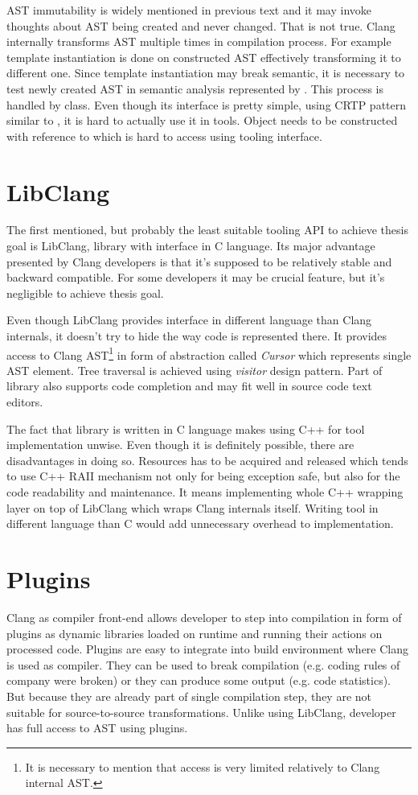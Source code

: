 AST immutability is widely mentioned in previous text and it may invoke thoughts about AST being created and never changed. That is not true. Clang internally transforms AST multiple times in compilation process. For example template instantiation is done on constructed AST effectively transforming it to different one. Since template instantiation may break semantic, it is necessary to test newly created AST in semantic analysis represented by . This process is handled by  class. Even though its interface is pretty simple, using CRTP pattern similar to , it is hard to actually use it in tools. Object needs to be constructed with reference to  which is hard to access using tooling interface. 

\section{LibClang}
The first mentioned, but probably the least suitable tooling API to achieve thesis goal is LibClang, library with interface in C language. Its major advantage presented by Clang developers is that it's supposed to be relatively stable and backward compatible. For some developers it may be crucial feature, but it's negligible to achieve thesis goal.

Even though LibClang provides interface in different language than Clang internals, it doesn't try to hide the way code is represented there. It provides access to Clang AST\footnote{It is necessary to mention that access is very limited relatively to Clang internal AST.} in form of abstraction called \emph{Cursor} which represents single AST element. Tree traversal is achieved using \emph{visitor} design pattern. Part of library also supports code completion and may fit well in source code text editors.

The fact that library is written in C language makes using C++ for tool implementation unwise. Even though it is definitely possible, there are disadvantages in doing so. Resources has to be acquired and released which tends to use C++ RAII mechanism not only for being exception safe, but also for the code readability and maintenance. It means implementing whole C++ wrapping layer on top of LibClang which wraps Clang internals itself. Writing tool in different language than C would add unnecessary overhead to implementation. 

\section{Plugins}
Clang as compiler front-end allows developer to step into compilation in form of plugins as dynamic libraries loaded on runtime and running their actions on processed code. Plugins are easy to integrate into build environment where Clang is used as compiler. They can be used to break compilation (e.g.  coding rules of company were broken) or they can produce some output (e.g. code statistics). But because they are already part of single compilation step, they are not suitable for source-to-source transformations. Unlike using LibClang, developer has full access to AST using plugins.

